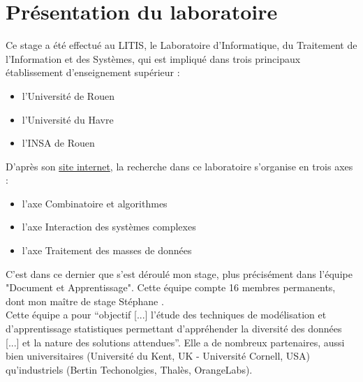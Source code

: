 \section{Présentation du laboratoire}
Ce stage a été effectué au LITIS, le Laboratoire d'Informatique, du Traitement de l'Information et des Systèmes, qui est impliqué dans trois principaux établissement d'enseignement supérieur :
\begin{itemize}
	\item l'Université de Rouen
	\item l'Université du Havre
	\item l'INSA de Rouen
\end{itemize}

\bigskip
D'après son \href{http://www.litislab.eu/}{site internet}, la recherche dans ce laboratoire s'organise en trois axes :
\begin{itemize}
	\item l'axe Combinatoire et algorithmes
	\item l'axe Interaction des systèmes complexes
	\item l'axe Traitement des masses de données
\end{itemize}

\bigskip
C'est dans ce dernier que s'est déroulé mon stage, plus précisément dans l'équipe "Document et Apprentissage". Cette équipe compte 16 membres permanents, dont mon maître de stage Stéphane . \\
Cette équipe a pour \enquote{objectif [...] l'étude des techniques de modélisation et d’apprentissage statistiques permettant d’appréhender la diversité des données [...] et la nature des solutions attendues}. Elle a de nombreux partenaires, aussi bien universitaires (Université du Kent, UK - Université Cornell, USA) qu'industriels (Bertin Techonolgies, Thalès, OrangeLabs). 

\newpage
